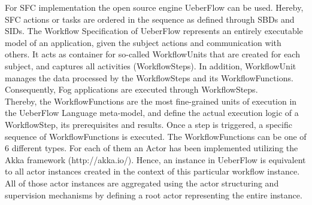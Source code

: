 For SFC implementation the open source engine UeberFlow \cite{DynamicPerspective} can be used. Hereby, SFC actions or tasks are ordered in the sequence as defined through SBDs and SIDs. The Workflow Specification of UeberFlow represents an entirely executable model of an application, given the subject actions and communication with others. It acts as container for so-called WorkflowUnits that are created for each subject, and captures all activities (WorkflowSteps). In addition, WorkflowUnit manages the data processed by the WorkflowSteps and its WorkflowFunctions. Consequently, Fog applications are executed through WorkflowSteps.
\\
Thereby, the WorkflowFunctions are the most fine-grained units of execution in the UeberFlow Language meta-model, and define the actual execution logic of a WorkflowStep, its prerequisites and results. Once a step is triggered, a specific sequence of WorkflowFunctions is executed. The WorkflowFunctions can be one of 6 different types. For each of them an Actor has been implemented utilizing the Akka framework (http://akka.io/). Hence, an instance in UeberFlow is equivalent to all actor instances created in the context of this particular workflow instance. All of those actor instances are aggregated using the actor structuring and supervision mechanisms by defining a root actor representing the entire instance.

